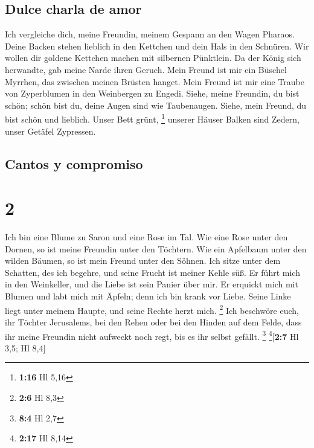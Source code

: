 \hypertarget{dulce-charla-de-amor}{%
\subsection{Dulce charla de amor}\label{dulce-charla-de-amor}}

 Ich vergleiche dich, meine Freundin, meinem Gespann an
den Wagen Pharaos.  Deine Backen stehen lieblich in den
Kettchen und dein Hals in den Schnüren.  Wir wollen dir
goldene Kettchen machen mit silbernen Pünktlein.  Da der
König sich herwandte, gab meine Narde ihren Geruch.  Mein
Freund ist mir ein Büschel Myrrhen, das zwischen meinen Brüsten hanget.
 Mein Freund ist mir eine Traube von Zyperblumen in den
Weinbergen zu Engedi.  Siehe, meine Freundin, du bist
schön; schön bist du, deine Augen sind wie Taubenaugen. 
Siehe, mein Freund, du bist schön und lieblich. Unser Bett grünt,
\footnote{\textbf{1:16} Hl 5,16}  unserer Häuser Balken
sind Zedern, unser Getäfel Zypressen.

\hypertarget{cantos-y-compromiso}{%
\subsection{Cantos y compromiso}\label{cantos-y-compromiso}}

\hypertarget{section-1}{%
\section{2}\label{section-1}}

 Ich bin eine Blume zu Saron und eine Rose im Tal.
 Wie eine Rose unter den Dornen, so ist meine Freundin
unter den Töchtern.  Wie ein Apfelbaum unter den wilden
Bäumen, so ist mein Freund unter den Söhnen. Ich sitze unter dem
Schatten, des ich begehre, und seine Frucht ist meiner Kehle süß.
 Er führt mich in den Weinkeller, und die Liebe ist sein
Panier über mir.  Er erquickt mich mit Blumen und labt
mich mit Äpfeln; denn ich bin krank vor Liebe.  Seine
Linke liegt unter meinem Haupte, und seine Rechte herzt mich.
\footnote{\textbf{2:6} Hl 8,3}  Ich beschwöre euch, ihr
Töchter Jerusalems, bei den Rehen oder bei den Hinden auf dem Felde,
dass ihr meine Freundin nicht aufweckt noch regt, bis es ihr selbst
gefällt. \footnote{\textbf{8:4} Hl 2,7} \footnote{\textbf{2:17} Hl 8,14}{[}\textbf{2:7}
Hl 3,5; Hl 8,4{]}

